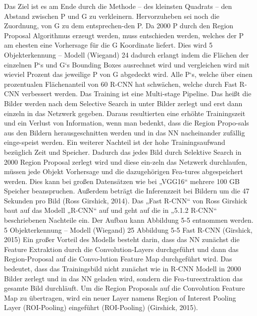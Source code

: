 \documentclass{llncs}
\begin{document}
Das Ziel ist es am Ende durch die Methode – des kleinsten Quadrats – den Abstand zwischen P und G zu verkleinern. Hervorzuheben sei noch die Zuordnung, von G zu dem entsprechen-den P. Da 2000 P durch den Region Proposal Algorithmus erzeugt werden, muss entschieden werden, welches der P am ehesten eine Vorhersage für die G Koordinate liefert. Dies wird
5 Objekterkennung – Modell (Wiegand)
24
dadurch erlangt indem die Flächen der einzelnen P`s und G`s Bounding Boxes ausrechnet wird und vergleichen wird mit wieviel Prozent das jeweilige P von G abgedeckt wird. Alle P`s, welche über einen prozentualen Flächenanteil von 60%
R-CNN hat schwächen, welche durch Fast R-CNN verbessert werden. Das Training ist eine Multi-stage Pipeline. Das heißt die Bilder werden nach dem Selective Search in unter Bilder zerlegt und erst dann einzeln in das Netzwerk gegeben. Daraus resultierten eine erhöhte Trainingszeit und ein Verlust von Information, wenn man bedenkt, dass die Region Propo-sals aus den Bildern herausgeschnitten werden und in das NN nacheinander zufällig einge-speist werden.
Ein weiterer Nachteil ist der hohe Trainingsaufwand bezüglich Zeit und Speicher. Dadurch das jedes Bild durch Selektive Search in 2000 Region Proposal zerlegt wird und diese ein-zeln das Netzwerk durchlaufen, müssen jede Objekt Vorhersage und die dazugehörigen Fea-tures abgespeichert werden. Dies kann bei großen Datensätzen wie bei „VGG16“ mehrere 100 GB Speicher beanspruchen. Außerdem beträgt die Inferenzzeit bei Bildern um die 47 Sekunden pro Bild (Ross Girshick, 2014).
Das „Fast R-CNN“ von Ross Girshick baut auf das Modell „R-CNN“ auf und geht auf die in „5.1.2 R-CNN“ beschriebenen Nachteile ein. Der Aufbau kann Abbildung 5-5 entnommen werden.
5 Objekterkennung – Modell (Wiegand)
25
Abbildung 5-5 Fast R-CNN (Girshick, 2015)
Ein großer Vorteil des Modells besteht darin, dass das NN zunächst die Feature Extraktion durch die Convolution-Layers durchgeführt und dann das Region-Proposal auf die Convo-lution Feature Map durchgeführt wird. Das bedeutet, dass das Trainingsbild nicht zunächst wie in R-CNN Modell in 2000 Bilder zerlegt und in das NN geladen wird, sondern die Fea-tureextraktion das gesamte Bild durchläuft. Um die Region Proposals auf die Convolution Feature Map zu übertragen, wird ein neuer Layer namens Region of Interest Pooling Layer (ROI-Pooling) eingeführt (ROI-Pooling) (Girshick, 2015).
\end{document}

